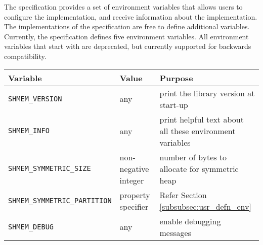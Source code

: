 The \openshmem specification provides a set of environment variables that allows
users to configure the \openshmem implementation, and receive information about
the implementation. The implementations of the specification are free to define
additional variables. Currently, the specification defines five environment
variables. All environment variables that start with  are
deprecated, but currently supported for backwards compatibility.

\medskip{}

\begin{tabular}{|l|l|l|}
\hline 
Variable & Value & Purpose\tabularnewline
\hline 
\hline 
\texttt{SHMEM\_VERSION} & any & print the library version at
start-up\tabularnewline
\hline 
\texttt{SHMEM\_INFO} & any & print helpful text about all these environment
variables\tabularnewline
\hline 
\texttt{SHMEM\_SYMMETRIC\_SIZE} & non-negative integer & number of bytes to
allocate for symmetric heap\tabularnewline
\hline 
\texttt{SHMEM\_SYMMETRIC\_PARTITION} & property specifier & Refer Section 
\ref{subsubsec:usr_defn_env}\tabularnewline
\hline 
\texttt{SHMEM\_DEBUG} & any & enable debugging messages\tabularnewline
\hline 
\end{tabular}

\medskip{}